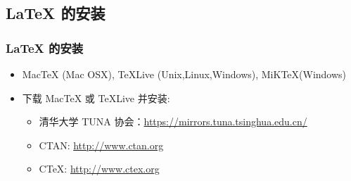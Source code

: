 \documentclass[8pt,aspectratio=169,mathserif,UTF8]{beamer}
\begin{document}
\subsection{LaTeX 的安装}
\begin{frame}
  \frametitle{LaTeX 的安装}
     \begin{itemize}
      \item MacTeX (Mac OSX), TeXLive (Unix,Linux,Windows), MiKTeX(Windows)
      \item 下载 MacTeX 或 TeXLive 并安装:
         \begin{itemize}
          \item 清华大学 TUNA 协会：\href{https://mirrors.tuna.tsinghua.edu.cn/}{https://mirrors.tuna.tsinghua.edu.cn/}
           \item CTAN: \href{http://www.ctan.org}{http://www.ctan.org}
          \item  CTeX: \href{http://www.ctex.org}{http://www.ctex.org}
         \end{itemize}
      \end{itemize}
\end{frame}
\end{document}
